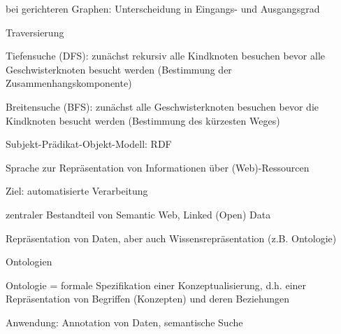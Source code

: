 \documentclass[a4paper]{article}
\begin{document}
\begin{multicols}{3}
\begin{itemize*}
\begin{itemize*}
\begin{itemize*}
                \item bei gerichteren Graphen: Unterscheidung in Eingangs- und Ausgangsgrad
            \end{itemize*}
            \item Traversierung
            \begin{itemize*}
                \item Tiefensuche (DFS): zunächst rekursiv alle Kindknoten besuchen bevor alle Geschwisterknoten besucht werden (Bestimmung der Zusammenhangskomponente)
                \item Breitensuche (BFS): zunächst alle Geschwisterknoten besuchen bevor die Kindknoten besucht werden (Bestimmung des kürzesten Weges)
            \end{itemize*}
        \end{itemize*}

        Subjekt-Prädikat-Objekt-Modell: RDF
        \begin{itemize*}
            \item Sprache zur Repräsentation von Informationen über (Web)-Ressourcen
            \item Ziel: automatisierte Verarbeitung
            \item zentraler Bestandteil von Semantic Web, Linked (Open) Data
            \item Repräsentation von Daten, aber auch Wissensrepräsentation (z.B. Ontologie)
        \end{itemize*}

        Ontologien
        \begin{itemize*}
            \item Ontologie = formale Spezifikation einer Konzeptualisierung, d.h. einer Repräsentation von Begriffen (Konzepten) und deren Beziehungen
            \item Anwendung: Annotation von Daten, semantische Suche
        \end{itemize*}


\end{itemize*}
\end{multicols}
\end{document}
